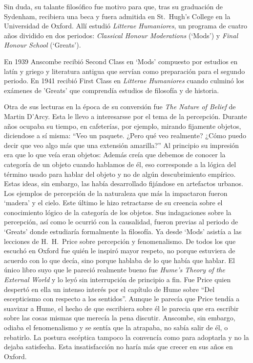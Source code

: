Sin duda, su talante filosófico fue motivo para que, tras su graduación de Sydenham, recibiera una beca y fuera admitida en St.~Hugh's College en la Universidad de Oxford. Allí estudió \emph{Litterae Humaniores}, un programa de cuatro años dividido en dos periodos: \emph{Classical Honour Moderations} (`Mods') y \emph{Final Honour School} (`Greats').

En 1939 Anscombe recibió Second Class en `Mods' compuesto por estudios en latín y griego y literatura antigua que servían como preparación para el segundo periodo. En 1941 recibió First Class en \emph{Litterae Humaniores} cuando culminó los exámenes de 'Greats' que comprendía estudios de filosofía y de historia.

Otra de sus lecturas en la época de su conversión fue \emph{The Nature of Belief} de Martin D'Arcy. Esta le llevo a interesarsse por el tema de la percepción. Durante años ocupaba su tiempo, en cafeterías, por ejemplo, mirando fijamente objetos, diciendose a sí misma: \enquote{Veo un paquete. ¿Pero qué veo realmente? ¿Cómo puedo decir que veo algo más que una extensión amarilla?}\autocite[Cf.~][viii]{anscombe1981metaphysics} Al principio su impresión era que lo que veía eran objetos: \autocite[viii]{anscombe1981metaphysics} Además creía que debemos de conocer la categoría de un objeto cuando hablamos de él, eso corresponde a la lógica del término usado para hablar del objeto y no de algún descubrimiento empírico. Estas ideas, sin embargo, las había desarrollado fijándose en artefactos urbanos. Los ejemplos de percepción de la naturaleza que más la impactaron fueron `madera' y el cielo. Este último le hizo retractarse de su creencia sobre el conocimiento lógico de la categoría de los objetos.\autocite[Cf.~][viii]{anscombe1981metaphysics} Sus indagaciones sobre la percepción, así como le ocurrió con la causalidad, fueron previas al periodo de `Greats' donde estudiaría formalmente la filosofía. Ya desde `Mods' asistía a las lecciones de H.~H.~Price sobre percepción y fenomenalismo. De todos los que escuchó en Oxford fue quién le inspiró mayor respeto, no porque estuviera de acuerdo con lo que decía, sino porque hablaba de lo que había que hablar. El único libro suyo que le pareció realmente bueno fue \emph{Hume's Theory of the External World} y lo leyó sin interrupción de principio a fin. Fue Price quien despertó en ella un intenso interés por el capítulo de Hume sobre ``Del escepticismo con respecto a los sentidos''. Aunque le parecía que Price tendía a suavizar a Hume, el hecho de que escribiera sobre él le parecia que era escribir sobre las cosas mismas que merecía la pena discutir. Anscombe, sin embargo, odiaba el fenomenalismo y se sentía que la atrapaba, no sabía salir de él, o rebatirlo. La postura escéptica tampoco la convencía como para adoptarla y no la dejaba satisfecha. Esta insatisfacción no haría más que crecer en sus años en Oxford. \autocites[Cf.~][viii]{anscombe1981metaphysics} [~y~][26]{torralba2005accion}

